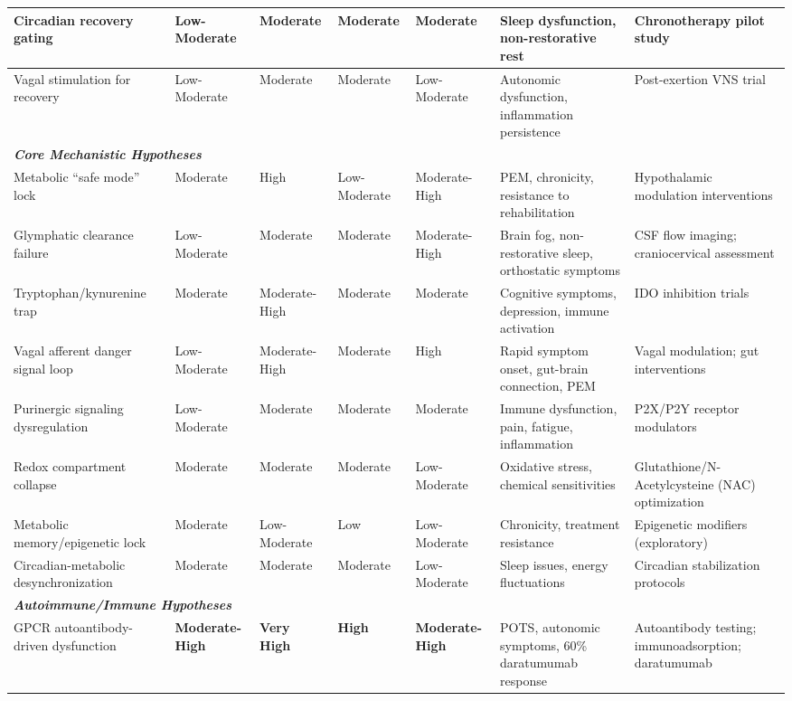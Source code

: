\begin{landscape}
\begin{longtable}{p{3.5cm}p{2cm}p{2cm}p{1.8cm}p{1.8cm}p{4.5cm}p{5cm}}
\midrule
Circadian recovery gating & Low-Moderate & Moderate & Moderate & Moderate & Sleep dysfunction, non-restorative rest & Chronotherapy pilot study \\
\midrule
Vagal stimulation for recovery & Low-Moderate & Moderate & Moderate & Low-Moderate & Autonomic dysfunction, inflammation persistence & Post-exertion VNS trial \\
\midrule
\multicolumn{7}{l}{\textit{\textbf{Core Mechanistic Hypotheses}}} \\
\midrule
Metabolic ``safe mode'' lock & Moderate & High & Low-Moderate & Moderate-High & PEM, chronicity, resistance to rehabilitation & Hypothalamic modulation interventions \\
\midrule
Glymphatic clearance failure & Low-Moderate & Moderate & Moderate & Moderate-High & Brain fog, non-restorative sleep, orthostatic symptoms & CSF flow imaging; craniocervical assessment \\
\midrule
Tryptophan/kynurenine trap & Moderate & Moderate-High & Moderate & Moderate & Cognitive symptoms, depression, immune activation & IDO inhibition trials \\
\midrule
Vagal afferent danger signal loop & Low-Moderate & Moderate-High & Moderate & High & Rapid symptom onset, gut-brain connection, PEM & Vagal modulation; gut interventions \\
\midrule
Purinergic signaling dysregulation & Low-Moderate & Moderate & Moderate & Moderate & Immune dysfunction, pain, fatigue, inflammation & P2X/P2Y receptor modulators \\
\midrule
Redox compartment collapse & Moderate & Moderate & Moderate & Low-Moderate & Oxidative stress, chemical sensitivities & Glutathione/N-Acetylcysteine (NAC) optimization \\
\midrule
Metabolic memory/epigenetic lock & Moderate & Low-Moderate & Low & Low-Moderate & Chronicity, treatment resistance & Epigenetic modifiers (exploratory) \\
\midrule
Circadian-metabolic desynchronization & Moderate & Moderate & Moderate & Low-Moderate & Sleep issues, energy fluctuations & Circadian stabilization protocols \\
\midrule
\multicolumn{7}{l}{\textit{\textbf{Autoimmune/Immune Hypotheses}}} \\
\midrule
GPCR autoantibody-driven dysfunction & \textbf{Moderate-High} & \textbf{Very High} & \textbf{High} & \textbf{Moderate-High} & POTS, autonomic symptoms, 60\% daratumumab response & Autoantibody testing; immunoadsorption; daratumumab \\

\end{longtable}
\end{landscape}
